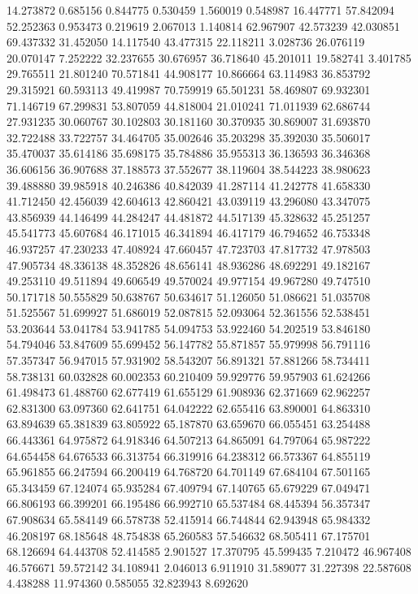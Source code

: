 14.273872
0.685156
0.844775
0.530459
1.560019
0.548987
16.447771
57.842094
52.252363
0.953473
0.219619
2.067013
1.140814
62.967907
42.573239
42.030851
69.437332
31.452050
14.117540
43.477315
22.118211
3.028736
26.076119
20.070147
7.252222
32.237655
30.676957
36.718640
45.201011
19.582741
3.401785
29.765511
21.801240
70.571841
44.908177
10.866664
63.114983
36.853792
29.315921
60.593113
49.419987
70.759919
65.501231
58.469807
69.932301
71.146719
67.299831
53.807059
44.818004
21.010241
71.011939
62.686744
27.931235
30.060767
30.102803
30.181160
30.370935
30.869007
31.693870
32.722488
33.722757
34.464705
35.002646
35.203298
35.392030
35.506017
35.470037
35.614186
35.698175
35.784886
35.955313
36.136593
36.346368
36.606156
36.907688
37.188573
37.552677
38.119604
38.544223
38.980623
39.488880
39.985918
40.246386
40.842039
41.287114
41.242778
41.658330
41.712450
42.456039
42.604613
42.860421
43.039119
43.296080
43.347075
43.856939
44.146499
44.284247
44.481872
44.517139
45.328632
45.251257
45.541773
45.607684
46.171015
46.341894
46.417179
46.794652
46.753348
46.937257
47.230233
47.408924
47.660457
47.723703
47.817732
47.978503
47.905734
48.336138
48.352826
48.656141
48.936286
48.692291
49.182167
49.253110
49.511894
49.606549
49.570024
49.977154
49.967280
49.747510
50.171718
50.555829
50.638767
50.634617
51.126050
51.086621
51.035708
51.525567
51.699927
51.686019
52.087815
52.093064
52.361556
52.538451
53.203644
53.041784
53.941785
54.094753
53.922460
54.202519
53.846180
54.794046
53.847609
55.699452
56.147782
55.871857
55.979998
56.791116
57.357347
56.947015
57.931902
58.543207
56.891321
57.881266
58.734411
58.738131
60.032828
60.002353
60.210409
59.929776
59.957903
61.624266
61.498473
61.488760
62.677419
61.655129
61.908936
62.371669
62.962257
62.831300
63.097360
62.641751
64.042222
62.655416
63.890001
64.863310
63.894639
65.381839
63.805922
65.187870
63.659670
66.055451
63.254488
66.443361
64.975872
64.918346
64.507213
64.865091
64.797064
65.987222
64.654458
64.676533
66.313754
66.319916
64.238312
66.573367
64.855119
65.961855
66.247594
66.200419
64.768720
64.701149
67.684104
67.501165
65.343459
67.124074
65.935284
67.409794
67.140765
65.679229
67.049471
66.806193
66.399201
66.195486
66.992710
65.537484
68.445394
56.357347
67.908634
65.584149
66.578738
52.415914
66.744844
62.943948
65.984332
46.208197
68.185648
48.754838
65.260583
57.546632
68.505411
67.175701
68.126694
64.443708
52.414585
2.901527
17.370795
45.599435
7.210472
46.967408
46.576671
59.572142
34.108941
2.046013
6.911910
31.589077
31.227398
22.587608
4.438288
11.974360
0.585055
32.823943
8.692620
